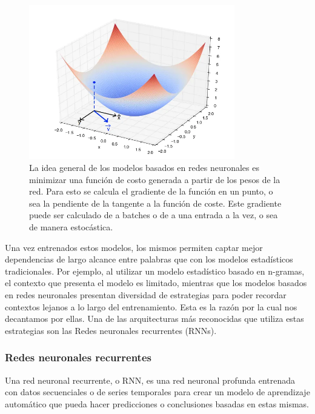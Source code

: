 \begin{figure}[H]
    \centering
    \includegraphics[width=0.8\textwidth]{imagenes/function.jpg}
    \caption{La idea general de los modelos basados en redes neuronales es minimizar una función de costo generada a partir de los pesos de la red. Para esto se calcula el gradiente de la función en un punto, o sea la pendiente de la tangente a la función de coste. Este gradiente puede ser calculado de a batches o de a una entrada a la vez, o sea de manera estocástica.}
    \label{fig:gradiente}
\end{figure}

Una vez entrenados estos modelos, los mismos permiten captar mejor dependencias de largo alcance entre palabras que con los modelos estadísticos tradicionales. \parencite{Wang2017ngram} Por ejemplo, al utilizar un modelo estadístico basado en n-gramas, el contexto que presenta el modelo es limitado, mientras que los modelos basados en redes neuronales presentan diversidad de estrategias para poder recordar contextos lejanos a lo largo del entrenamiento. Esta es la razón por la cual nos decantamos por ellas. Una de las arquitecturas más reconocidas que utiliza estas estrategias son las Redes neuronales recurrentes (RNNs).

\subsubsection{Redes neuronales recurrentes}

Una red neuronal recurrente, o RNN, es una red neuronal profunda entrenada con datos secuenciales o de series temporales para crear un modelo de aprendizaje automático que pueda hacer predicciones o conclusiones basadas en estas mismas.

